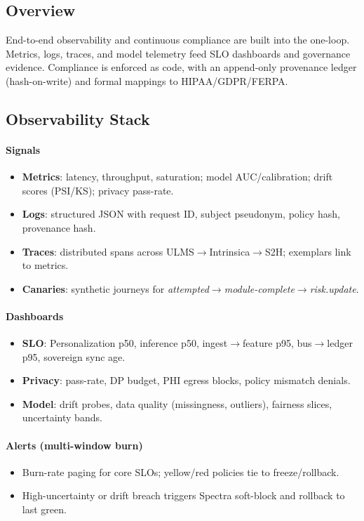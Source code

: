 \documentclass[11pt]{article}
\theoremstyle{plain}
\begin{document}
\subsection{Overview}
End-to-end observability and continuous compliance are built into the one-loop. Metrics, logs, traces, and model telemetry feed SLO dashboards and governance evidence. Compliance is enforced as code, with an append-only provenance ledger (hash-on-write) and formal mappings to HIPAA/GDPR/FERPA.

\subsection{Observability Stack}
\paragraph{Signals}
\begin{itemize}
  \item \textbf{Metrics}: latency, throughput, saturation; model AUC/calibration; drift scores (PSI/KS); privacy pass-rate.
  \item \textbf{Logs}: structured JSON with request ID, subject pseudonym, policy hash, provenance hash.
  \item \textbf{Traces}: distributed spans across ULMS$\rightarrow$Intrinsica$\rightarrow$S2H; exemplars link to metrics.
  \item \textbf{Canaries}: synthetic journeys for \emph{attempted}$\rightarrow$\emph{module-complete}$\rightarrow$\emph{risk.update}.
\end{itemize}

\paragraph{Dashboards}
\begin{itemize}
  \item \textbf{SLO}: Personalization p50, inference p50, ingest$\rightarrow$feature p95, bus$\rightarrow$ledger p95, sovereign sync age.
  \item \textbf{Privacy}: pass-rate, DP budget, PHI egress blocks, policy mismatch denials.
  \item \textbf{Model}: drift probes, data quality (missingness, outliers), fairness slices, uncertainty bands.
\end{itemize}

\paragraph{Alerts (multi-window burn)}
\begin{itemize}
  \item Burn-rate paging for core SLOs; yellow/red policies tie to freeze/rollback.
  \item High-uncertainty or drift breach triggers Spectra soft-block and rollback to last green.
\end{itemize}
\end{document}
